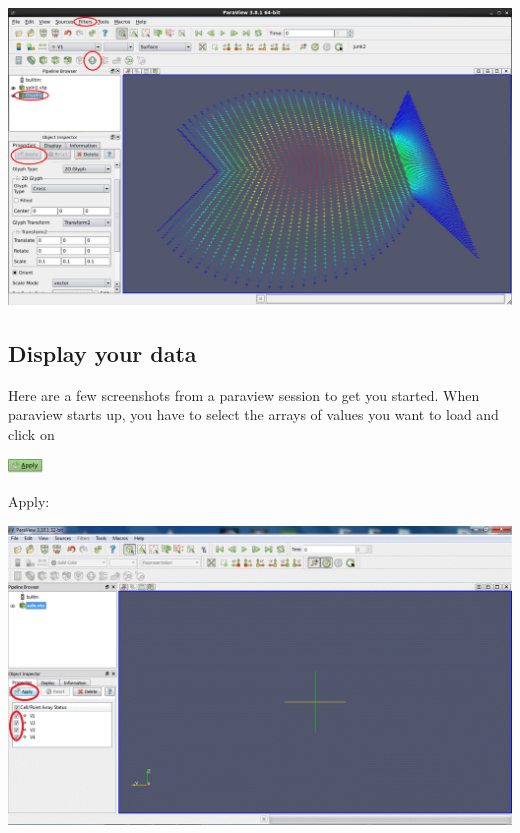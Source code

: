  
\begin{DoxyImageNoCaption}
  \mbox{\includegraphics[width=\textwidth]{paraview00}}
\end{DoxyImageNoCaption}
\hypertarget{index_display}{}\subsection{Display your data}\label{index_display}
Here are a few screenshots from a paraview session to get you started. When paraview starts up, you have to select the arrays of values you want to load and click on  
\begin{DoxyImageNoCaption}
  \mbox{\includegraphics[width=0.07\textwidth]{apply_button}}
\end{DoxyImageNoCaption}
 {\ttfamily Apply\+:} 

 
\begin{DoxyImageNoCaption}
  \mbox{\includegraphics[width=\textwidth]{paraview01}}
\end{DoxyImageNoCaption}


